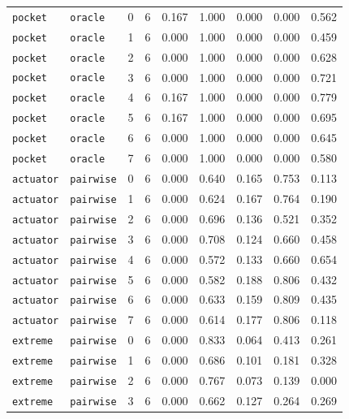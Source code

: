 \documentclass{article}
\begin{document}
\begin{center}
\begin{tabular}{lllcccccc}
\texttt{pocket} & \texttt{oracle} & 0 & 6 & 0.167 & 1.000 & 0.000 & 0.000 & 0.562 \\
\texttt{pocket} & \texttt{oracle} & 1 & 6 & 0.000 & 1.000 & 0.000 & 0.000 & 0.459 \\
\texttt{pocket} & \texttt{oracle} & 2 & 6 & 0.000 & 1.000 & 0.000 & 0.000 & 0.628 \\
\texttt{pocket} & \texttt{oracle} & 3 & 6 & 0.000 & 1.000 & 0.000 & 0.000 & 0.721 \\
\texttt{pocket} & \texttt{oracle} & 4 & 6 & 0.167 & 1.000 & 0.000 & 0.000 & 0.779 \\
\texttt{pocket} & \texttt{oracle} & 5 & 6 & 0.167 & 1.000 & 0.000 & 0.000 & 0.695 \\
\texttt{pocket} & \texttt{oracle} & 6 & 6 & 0.000 & 1.000 & 0.000 & 0.000 & 0.645 \\
\texttt{pocket} & \texttt{oracle} & 7 & 6 & 0.000 & 1.000 & 0.000 & 0.000 & 0.580 \\
\texttt{actuator} & \texttt{pairwise} & 0 & 6 & 0.000 & 0.640 & 0.165 & 0.753 & 0.113 \\
\texttt{actuator} & \texttt{pairwise} & 1 & 6 & 0.000 & 0.624 & 0.167 & 0.764 & 0.190 \\
\texttt{actuator} & \texttt{pairwise} & 2 & 6 & 0.000 & 0.696 & 0.136 & 0.521 & 0.352 \\
\texttt{actuator} & \texttt{pairwise} & 3 & 6 & 0.000 & 0.708 & 0.124 & 0.660 & 0.458 \\
\texttt{actuator} & \texttt{pairwise} & 4 & 6 & 0.000 & 0.572 & 0.133 & 0.660 & 0.654 \\
\texttt{actuator} & \texttt{pairwise} & 5 & 6 & 0.000 & 0.582 & 0.188 & 0.806 & 0.432 \\
\texttt{actuator} & \texttt{pairwise} & 6 & 6 & 0.000 & 0.633 & 0.159 & 0.809 & 0.435 \\
\texttt{actuator} & \texttt{pairwise} & 7 & 6 & 0.000 & 0.614 & 0.177 & 0.806 & 0.118 \\
\texttt{extreme} & \texttt{pairwise} & 0 & 6 & 0.000 & 0.833 & 0.064 & 0.413 & 0.261 \\
\texttt{extreme} & \texttt{pairwise} & 1 & 6 & 0.000 & 0.686 & 0.101 & 0.181 & 0.328 \\
\texttt{extreme} & \texttt{pairwise} & 2 & 6 & 0.000 & 0.767 & 0.073 & 0.139 & 0.000 \\
\texttt{extreme} & \texttt{pairwise} & 3 & 6 & 0.000 & 0.662 & 0.127 & 0.264 & 0.269 \\
\bottomrule
\end{tabular}
\end{center}
\end{document}

